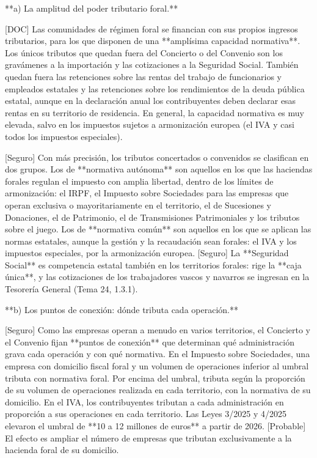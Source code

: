 \documentclass[10pt,a4paper]{article}
\begin{document}
**a) La amplitud del poder tributario foral.**

[DOC] Las comunidades de régimen foral se financian con sus propios ingresos tributarios, para los que disponen de una **amplísima capacidad normativa**. Los únicos tributos que quedan fuera del Concierto o del Convenio son los gravámenes a la importación y las cotizaciones a la Seguridad Social. También quedan fuera las retenciones sobre las rentas del trabajo de funcionarios y empleados estatales y las retenciones sobre los rendimientos de la deuda pública estatal, aunque en la declaración anual los contribuyentes deben declarar esas rentas en su territorio de residencia. En general, la capacidad normativa es muy elevada, salvo en los impuestos sujetos a armonización europea (el IVA y casi todos los impuestos especiales).

[Seguro] Con más precisión, los tributos concertados o convenidos se clasifican en dos grupos. Los de **normativa autónoma** son aquellos en los que las haciendas forales regulan el impuesto con amplia libertad, dentro de los límites de armonización: el IRPF, el Impuesto sobre Sociedades para las empresas que operan exclusiva o mayoritariamente en el territorio, el de Sucesiones y Donaciones, el de Patrimonio, el de Transmisiones Patrimoniales y los tributos sobre el juego. Los de **normativa común** son aquellos en los que se aplican las normas estatales, aunque la gestión y la recaudación sean forales: el IVA y los impuestos especiales, por la armonización europea. [Seguro] La **Seguridad Social** es competencia estatal también en los territorios forales: rige la **caja única**, y las cotizaciones de los trabajadores vascos y navarros se ingresan en la Tesorería General (Tema 24, 1.3.1).

**b) Los puntos de conexión: dónde tributa cada operación.**

[Seguro] Como las empresas operan a menudo en varios territorios, el Concierto y el Convenio fijan **puntos de conexión** que determinan qué administración grava cada operación y con qué normativa. En el Impuesto sobre Sociedades, una empresa con domicilio fiscal foral y un volumen de operaciones inferior al umbral tributa con normativa foral. Por encima del umbral, tributa según la proporción de su volumen de operaciones realizada en cada territorio, con la normativa de su domicilio. En el IVA, los contribuyentes tributan a cada administración en proporción a sus operaciones en cada territorio. Las Leyes 3/2025 y 4/2025 elevaron el umbral de **10 a 12 millones de euros** a partir de 2026. [Probable] El efecto es ampliar el número de empresas que tributan exclusivamente a la hacienda foral de su domicilio.
\end{document}
